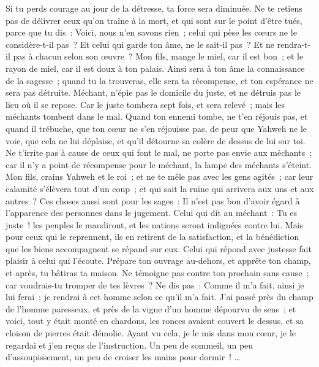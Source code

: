 \begin{multicols}{2}
Si tu perds courage au jour de la détresse, ta force sera diminuée.
Ne te retiens pas de délivrer ceux qu'on traîne à la mort, et qui sont sur le point d'être tués,
parce que tu dis~: Voici, nous n'en savons rien~; celui qui pèse les cœurs ne le considère-t-il pas~? Et celui qui garde ton âme, ne le sait-il pas~? Et ne rendra-t-il pas à chacun selon son œuvre~?
Mon fils, mange le miel, car il est bon~; et le rayon de miel, car il est doux à ton palais.
Ainsi sera à ton âme la connaissance de la sagesse~; quand tu la trouveras, elle sera ta récompense, et ton espérance ne sera pas détruite.
Méchant, n'épie pas le domicile du juste, et ne détruis pas le lieu où il se repose.
Car le juste tombera sept fois, et sera relevé~; mais les méchants tombent dans le mal.
Quand ton ennemi tombe, ne t'en réjouis pas, et quand il trébuche, que ton cœur ne s'en réjouisse pas,
de peur que Yahweh ne le voie, que cela ne lui déplaise, et qu'il détourne sa colère de dessus de lui sur toi.
Ne t'irrite pas à cause de ceux qui font le mal, ne porte pas envie aux méchants~;
car il n'y a point de récompense pour le méchant, la lampe des méchants s'éteint.
Mon fils, crains Yahweh et le roi~; et ne te mêle pas avec les gens agités~;
car leur calamité s'élèvera tout d'un coup~; et qui sait la ruine qui arrivera aux uns et aux autres~?
Ces choses aussi sont pour les sages~: Il n'est pas bon d'avoir égard à l'apparence des personnes dans le jugement.
Celui qui dit au méchant~: Tu es juste~! les peuples le maudiront, et les nations seront indignées contre lui.
Mais pour ceux qui le reprennent, ils en retirent de la satisfaction, et la bénédiction que les biens accompagnent se répand sur eux.
Celui qui répond avec justesse fait plaisir à celui qui l'écoute.
Prépare ton ouvrage au-dehors, et apprête ton champ, et après, tu bâtiras ta maison.
Ne témoigne pas contre ton prochain sans cause~; car voudrais-tu tromper de tes lèvres~?
Ne dis pas~: Comme il m'a fait, ainsi je lui ferai~; je rendrai à cet homme selon ce qu'il m'a fait.
J'ai passé près du champ de l'homme paresseux, et près de la vigne d'un homme dépourvu de sens~;
et voici, tout y était monté en chardons, les ronces avaient couvert le dessus, et sa cloison de pierres était démolie.
Ayant vu cela, je le mis dans mon cœur, je le regardai et j'en reçus de l'instruction.
Un peu de sommeil, un peu d'assoupissement, un peu de croiser les mains pour dormir~! …

\end{multicols}
